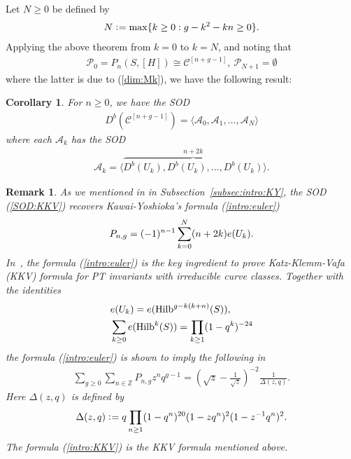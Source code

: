 \documentclass[11pt]{amsart}
\theoremstyle{plain}
\newtheorem{rmk}[thm]{Remark}
\newtheorem{cor}[thm]{Corollary}
\newcommand{\aA}{\mathcal{A}}
\newcommand{\cC}{\mathcal{C}}
\newcommand{\pP}{\mathcal{P}}
\newcommand{\Hilb}{\mathop{\rm Hilb}\nolimits}
\begin{document}
Let $N\ge 0$ be defined by
\begin{align*}
N \cneq \mathrm{max} \{ k \ge 0 : 
g-k^2-kn \ge 0\}.
\end{align*}
Applying the above theorem from $k=0$ to $k=N$, and noting 
that 
\begin{align*}
\pP_0=P_n(S, [H]) \cong \cC^{[n+g-1]}, \ 
\pP_{N+1}=\emptyset
\end{align*}
where the latter is due to (\ref{dim:Mk}), 
we have the following result: 
\begin{cor}\label{cor:KY}
For $n\ge 0$, we have the SOD 
\begin{align}\label{SOD:KKV}
D^b(\cC^{[n+g-1]})
=\langle \aA_0, \aA_1, \ldots, \aA_N \rangle
\end{align}
where each $\aA_k$ has the SOD
\begin{align*}
\aA_k=\langle \overbrace{D^b(U_k), D^b(U_k), \ldots, D^b(U_k)}^{n+2k}  \rangle. 
\end{align*}
\end{cor}

\begin{rmk}\label{rmk:KKV}
As we mentioned in 
in Subsection~\ref{subsec:intro:KY}, the 
SOD (\ref{SOD:KKV}) 
recovers Kawai-Yoshioka's formula (\ref{intro:euler})
\begin{align}\notag
P_{n, g} = (-1)^{n-1}\sum_{k=0}^{N}
(n+2k)e(U_k). 
\end{align}
In~\cite{KY}, the 
formula (\ref{intro:euler}) is the key 
ingredient to prove   
Katz-Klemm-Vafa (KKV) formula for PT
invariants with irreducible curve classes. 
Together with the identities
\begin{align*}
&e(U_k)=e(\Hilb^{g-k(k+n)}(S)), \\
&\sum_{k\ge 0} e(\Hilb^k(S))=
\prod_{k\ge 1}(1-q^k)^{-24}
\end{align*}
the formula (\ref{intro:euler}) is shown 
to imply the following in~\cite{KY}
\begin{align}\label{intro:KKV}
\sum_{g\ge 0} \sum_{n \in \mathbb{Z}}
P_{n, g}z^n q^{g-1}=\left(\sqrt{z}-\frac{1}{\sqrt{z}}  \right)^{-2}
\frac{1}{\Delta(z, q)}.
\end{align}
Here $\Delta(z, q)$ is defined by
\begin{align*}
\Delta(z, q) \cneq q \prod_{n\ge 1}
(1-q^n)^{20}(1-zq^n)^2 (1-z^{-1}q^n)^2. 
\end{align*}
The formula (\ref{intro:KKV})
is the KKV formula mentioned above. 
\end{rmk}
\end{document}
